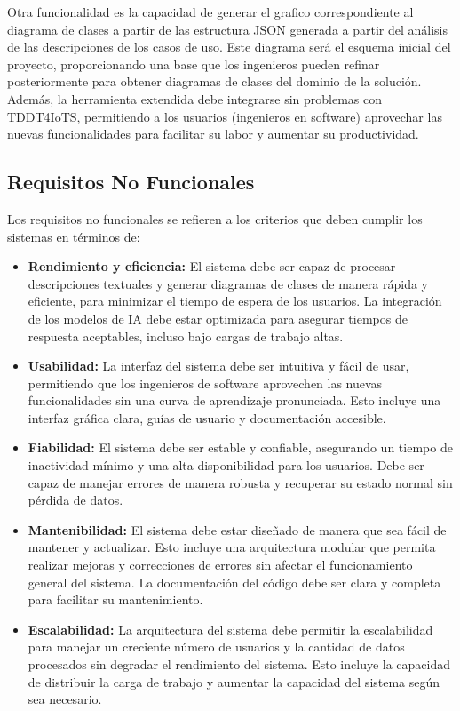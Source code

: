Otra funcionalidad es la capacidad de generar el grafico correspondiente al diagrama de clases a partir de las estructura JSON generada a partir del análisis de las descripciones de los casos de uso. Este diagrama será el esquema inicial del proyecto, proporcionando una base que los ingenieros pueden refinar posteriormente para obtener diagramas de clases del dominio de la solución. Además, la herramienta extendida debe integrarse sin problemas con TDDT4IoTS, permitiendo a los usuarios (ingenieros en software) aprovechar las nuevas funcionalidades para facilitar su labor y aumentar su productividad.

\subsection{Requisitos No Funcionales}

Los requisitos no funcionales se refieren a los criterios que deben cumplir los sistemas en términos de:

\begin{itemize}
	\item \textbf{Rendimiento y eficiencia:}
	El sistema debe ser capaz de procesar descripciones textuales y generar diagramas de clases de manera rápida y eficiente, para minimizar el tiempo de espera de los usuarios. La integración de los modelos de IA debe estar optimizada para asegurar tiempos de respuesta aceptables, incluso bajo cargas de trabajo altas.
	
	\item \textbf{Usabilidad:}
	La interfaz del sistema debe ser intuitiva y fácil de usar, permitiendo que los ingenieros de software aprovechen las nuevas funcionalidades sin una curva de aprendizaje pronunciada. Esto incluye una interfaz gráfica clara, guías de usuario y documentación accesible.
	
	\item \textbf{Fiabilidad:}
	El sistema debe ser estable y confiable, asegurando un tiempo de inactividad mínimo y una alta disponibilidad para los usuarios. Debe ser capaz de manejar errores de manera robusta y recuperar su estado normal sin pérdida de datos.
	
	\item \textbf{Mantenibilidad:}
	El sistema debe estar diseñado de manera que sea fácil de mantener y actualizar. Esto incluye una arquitectura modular que permita realizar mejoras y correcciones de errores sin afectar el funcionamiento general del sistema. La documentación del código debe ser clara y completa para facilitar su mantenimiento.
	
	\item \textbf{Escalabilidad:}
	La arquitectura del sistema debe permitir la escalabilidad para manejar un creciente número de usuarios y la cantidad de datos procesados sin degradar el rendimiento del sistema. Esto incluye la capacidad de distribuir la carga de trabajo y aumentar la capacidad del sistema según sea necesario.
\end{itemize}

